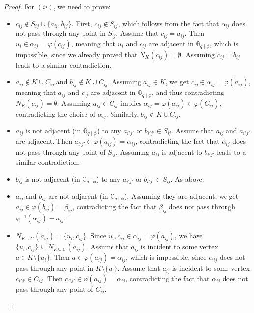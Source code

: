 \documentclass[a4paper,UKenglish,cleveref, autoref, thm-restate]{arxiv}
\newcommand{\Gphi}[1][q]{\mathbb{G}_{#1\mid\phi}}
\begin{document}
\begin{proof}
    \smallskip \noindent For  $(ii)$, we need to prove:
    \begin{itemize}
        \item $c_{ij} \not\in S_{ij} \cup \{a_{ij}, b_{ij}\}$. First, $c_{ij}\not\in S_{ij}$, which follows from the fact that $\alpha_{ij}$ does not pass through any point in $S_{ij}$. Assume that $c_{ij} = a_{ij}$.  Then $u_i \in \alpha_{ij} = \varphi(c_{ij})$,  meaning that $u_i$ and $c_{ij}$ are adjacent in $\Gphi$, which is impossible, since we already proved that $N_K(c_{ij})  = \emptyset$. Assuming $c_{ij} = b_{ij}$ leads to a similar contradiction.
        \item $a_{ij} \not\in K\cup C_{ij}$ and $b_{ij} \not\in K\cup C_{ij}$. Assuming $a_{ij}\in K$, we get $c_{ij} \in \alpha_{ij} = \varphi(a_{ij})$, meaning that $a_{ij}$ and $c_{ij}$ are adjacent in $\Gphi$, and thus contradicting $N_K(c_{ij})  = \emptyset$. Assuming $a_{ij}\in C_{ij}$ implies $\alpha_{ij} = \varphi(a_{ij}) \in \varphi(C_{ij})$, contradicting the choice of $\alpha_{ij}$. Similarly, $b_{ij} \not\in K\cup C_{ij}$.

        \item $a_{ij}$ is not adjacent (in $\Gphi$) to any $a_{i'j'}$ or $b_{i'j'}\in S_{ij}$. Assume that $a_{ij}$ and $a_{i'j'}$ are adjacent. Then $a_{i'j'} \in \varphi(a_{ij}) = \alpha_{ij}$, contradicting the fact that $\alpha_{ij}$ does not pass through any point of $S_{ij}$. Assuming $a_{ij}$ is adjacent to $b_{i'j'}$ leads to a similar contradiction.

        \item $b_{ij}$ is not adjacent (in $\Gphi$) to any $a_{i'j'}$ or $b_{i'j'}\in S_{ij}$. As above.

        \item $a_{ij}$ and $b_{ij}$ are not adjacent (in $\Gphi$). Assuming they are adjacent, we get $a_{ij} \in \varphi(b_{ij}) = \beta_{ij}$, contradicting the fact that $\beta_{ij}$ does not pass through $\varphi^{-1}(\alpha_{ij}) = a_{ij}$.

        \item $N_{K \cup C}(a_{ij}) = \{u_{i}, c_{ij}\}$. Since $u_i, c_{ij} \in \alpha_{ij} = \varphi(a_{ij})$, we have $\{u_{i}, c_{ij}\} \subseteq N_{K \cup C}(a_{ij})$. Assume that $a_{ij}$ is incident to some vertex $a\in K \setminus \{u_i\}$. Then $a\in \varphi(a_{ij}) = \alpha_{ij}$, which is impossible, since $\alpha_{ij}$ does not pass through any point in $K \setminus \{u_i\}$. Assume that $a_{ij}$ is incident to some vertex $c_{i'j'}\in C_{ij}$. Then $c_{i'j'} \in \varphi(a_{ij}) = \alpha_{ij}$, contradicting the fact that $\alpha_{ij}$ does not pass through any point of $C_{ij}$.


\end{itemize}
\end{proof}
\end{document}
